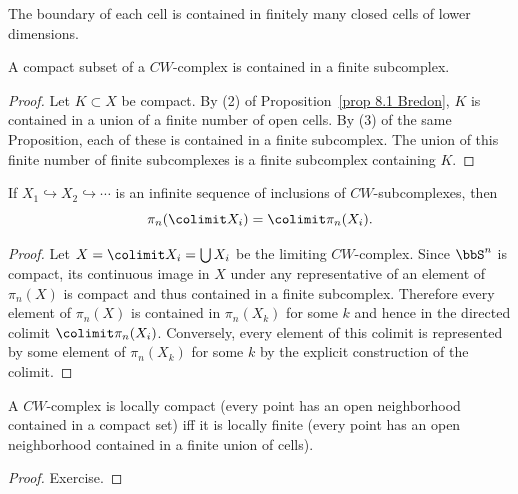 \begin{cor}
    The boundary of each cell is contained in finitely many closed cells of lower dimensions.
\end{cor}

\begin{thm}\label{thm 8.2 Bredon}
    A compact subset of a $CW$-complex is contained in a finite subcomplex.
\end{thm}
\begin{proof}
    Let $K\subset X$ be compact. By (2) of Proposition~\ref{prop 8.1 Bredon}, $K$ is contained in a union of a finite number of open cells. By (3) of the same Proposition, each of these is contained in a finite subcomplex. The union of this finite number of finite subcomplexes is a finite subcomplex containing $K$.
\end{proof}

\begin{cor}\label{cor direct limit of pi_n for CW}
    If $X_1\hookrightarrow X_2\hookrightarrow \cdots$ is an infinite sequence of inclusions of $CW$-subcomplexes, then 
    \[\pi_n(\colimit X_i)=\colimit \pi_n(X_i).\]
\end{cor}
\begin{proof}
    Let $X=\colimit X_i=\bigcup X_i$ be the limiting $CW$-complex. Since $\bbS^n$ is compact, its continuous image in $X$ under any representative of an element of $\pi_n(X)$ is compact and thus contained in a finite subcomplex. Therefore every element of $\pi_n(X)$ is contained in $\pi_n(X_k)$ for some $k$ and hence in the directed colimit $\colimit \pi_n(X_i)$. Conversely, every element of this colimit is represented by some element of $\pi_n(X_k)$ for some $k$ by the explicit construction of the colimit.
\end{proof}




\begin{prop}
    A $CW$-complex is locally compact (every point has an open neighborhood contained in a compact set) iff it is locally finite (every point has an open neighborhood contained in a finite union of cells).
\end{prop}
\begin{proof}
    Exercise.
\end{proof}



